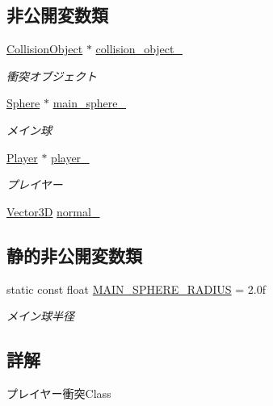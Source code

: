 \subsection*{非公開変数類}
\begin{DoxyCompactItemize}
\item 
\mbox{\hyperlink{class_collision_object}{Collision\+Object}} $\ast$ \mbox{\hyperlink{class_player_collision_a6e07c4eb15b2b02e167b7f52a6cc1ec4}{collision\+\_\+object\+\_\+}}
\begin{DoxyCompactList}\small\item\em 衝突オブジェクト \end{DoxyCompactList}\item 
\mbox{\hyperlink{class_sphere}{Sphere}} $\ast$ \mbox{\hyperlink{class_player_collision_a8165ba4a5bbe16afff43ca5b47e7218c}{main\+\_\+sphere\+\_\+}}
\begin{DoxyCompactList}\small\item\em メイン球 \end{DoxyCompactList}\item 
\mbox{\hyperlink{class_player}{Player}} $\ast$ \mbox{\hyperlink{class_player_collision_a29316f461679f5d3d3bb5234f04efdd0}{player\+\_\+}}
\begin{DoxyCompactList}\small\item\em プレイヤー \end{DoxyCompactList}\item 
\mbox{\hyperlink{class_vector3_d}{Vector3D}} \mbox{\hyperlink{class_player_collision_a9ba9817b42d8e2b12e7bebf4ef04832c}{normal\+\_\+}}
\end{DoxyCompactItemize}
\subsection*{静的非公開変数類}
\begin{DoxyCompactItemize}
\item 
static const float \mbox{\hyperlink{class_player_collision_af126facb26dd0862dd43470a35454922}{M\+A\+I\+N\+\_\+\+S\+P\+H\+E\+R\+E\+\_\+\+R\+A\+D\+I\+US}} = 2.\+0f
\begin{DoxyCompactList}\small\item\em メイン球半径 \end{DoxyCompactList}\end{DoxyCompactItemize}


\subsection{詳解}
プレイヤー衝突\+Class 

